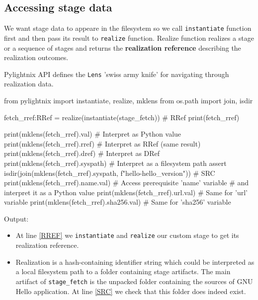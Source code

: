 \pagebreak
\subsection{Accessing stage data}

We want stage data to appeare in the filesystem so we call
\texttt{instantiate} function first and then pass its result to \texttt{realize}
function. Realize function realizes a stage or a sequence of stages and returns
the \textbf{realization reference} describing the realization outcomes.

Pylightnix API defines the \texttt{Lens} 'swiss army knife' for navigating
through realization data.

\begin{pythontexcode}
from pylightnix import instantiate, realize, mklens
from os.path import join, isdir

fetch_rref:RRef = realize(instantiate(stage_fetch))  # RRef \label{RREF}
print(fetch_rref)

print(mklens(fetch_rref).val)      # Interpret as Python value
print(mklens(fetch_rref).rref)     # Interpret as RRef (same result)
print(mklens(fetch_rref).dref)     # Interpret as DRef
print(mklens(fetch_rref).syspath)  # Interpret as a filesystem path
assert isdir(join(mklens(fetch_rref).syspath,
             f"hello-{hello_version}"))  # SRC \label{SRC}
print(mklens(fetch_rref).name.val) # Access prerequisite 'name' variable
                                   # and interpret it as a Python value
print(mklens(fetch_rref).url.val)  # Same for 'url' variable
print(mklens(fetch_rref).sha256.val)  # Same for 'sha256' variable
\end{pythontexcode}

Output:

\mysmallstdout

\begin{itemize}

  \item At line \ref{RREF} we \texttt{instantiate} and \texttt{realize} our
    custom stage to get its realization reference.

  \item Realization is a hash-containing identifier string which could be
    interpreted as a local filesystem path to a folder containing stage
    artifacts. The main artifact of \texttt{stage\_fetch} is the unpacked folder
    containing the sources of GNU Hello application. At line \ref{SRC} we check
    that this folder does indeed exist.

\end{itemize}

